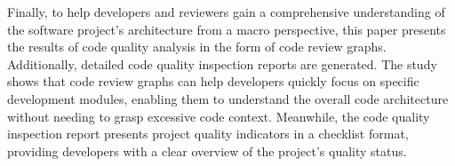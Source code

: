 \begin{eabstract}
  Finally, to help developers and reviewers gain a comprehensive understanding of the software project's architecture from a macro perspective, this paper presents the results of code quality analysis in the form of code review graphs. Additionally, detailed code quality inspection reports are generated. The study shows that code review graphs can help developers quickly focus on specific development modules, enabling them to understand the overall code architecture without needing to grasp excessive code context. Meanwhile, the code quality inspection report presents project quality indicators in a checklist format, providing developers with a clear overview of the project's quality status.
\end{eabstract}
